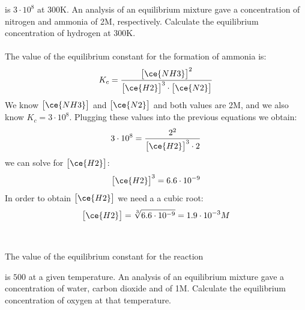\documentclass[main.tex]{subfiles}
\begin{document}
\begin{description}
\begin{example}
 is $3\cdot 10^{8}$ at 300K. An analysis of an equilibrium mixture gave a concentration of nitrogen and ammonia of 2M, respectively. Calculate the equilibrium concentration of hydrogen at 300K.
 \\
\\
The value of the equilibrium constant for the formation of ammonia is: 
 \begin{equation*} K_{c}=\frac{\big[ \ce{NH3} \big]^2 }{\big[ \ce{H2} \big]^3 \cdot \big[ \ce{N2} \big]}  \end{equation*}
We know $\big[ \ce{NH3} \big]$ and $\big[ \ce{N2} \big]$ and both values are 2M, and we also know $ K_{c}=3\cdot 10^{8}$. Plugging these values into the previous equations we obtain:
 \begin{equation*}3\cdot 10^{8}=\frac{2^2 } {\big[ \ce{H2} \big]^3 \cdot 2} \end{equation*}
we can solve for $\big[ \ce{H2} \big]$:
 \begin{equation*}\big[ \ce{H2} \big]^3= 6.6\cdot 10^{-9}   \end{equation*}
In order to obtain $\big[ \ce{H2} \big]$ we need a a cubic root:
 \begin{equation*}\big[ \ce{H2} \big]= \sqrt[3]{6.6\cdot 10^{-9}} =1.9\cdot 10^{-3}M  \end{equation*}
\\
\faDiamond\ \\
The value of the equilibrium constant for the reaction \begin{center}\end{center}  is $500$ at a given temperature. An analysis of an equilibrium mixture gave a concentration of water, carbon dioxide and  of 1M. Calculate the equilibrium concentration of oxygen at that temperature.\\
\end{example}%

\end{description}
 
\end{document}
